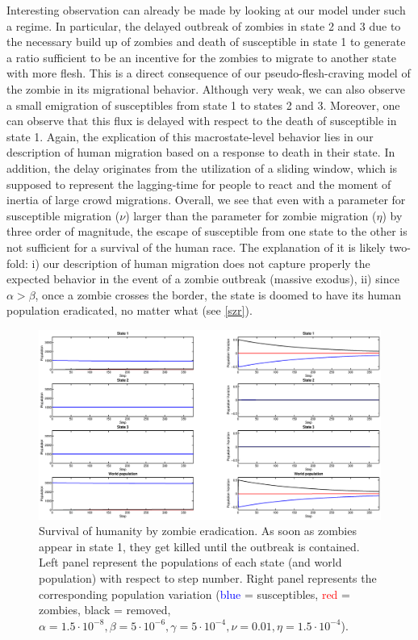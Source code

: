 \documentclass[11pt]{article} %
\begin{document}
Interesting observation can already be made by looking at our model under such a regime. In particular, the delayed outbreak of zombies in state 2 and 3 due to the necessary build up of zombies and death of susceptible in state 1 to generate a ratio sufficient to be an incentive for the zombies to migrate to another state with more flesh. This is a direct consequence of our pseudo-flesh-craving model of the zombie in its migrational behavior. Although very weak, we can also observe a small emigration of susceptibles from state 1 to states 2 and 3. Moreover, one can observe that this flux is delayed with respect to the death of susceptible in state 1. Again, the explication of this macrostate-level behavior lies in our description of human migration based on a response to death in their state. In addition, the delay originates from the utilization of a sliding window, which is supposed to represent the lagging-time for people to react and the moment of inertia of large crowd migrations. Overall, we see that even with a parameter for susceptible migration ($\nu$) larger than the parameter for zombie migration ($\eta$) by three order of magnitude, the escape of susceptible from one state to the other is not sufficient for a survival of the human race. The explanation of it is likely two-fold: i) our description of human migration does not capture properly the expected behavior in the event of a zombie outbreak (massive exodus), ii) since $\alpha>\beta$, once a zombie crosses the border, the state is doomed to have its human population eradicated, no matter what (see \ref{szr}). 
\begin{figure}[h!]
\centerline{
\includegraphics[scale=0.35]{../images/Matlab_figures/example_zkill.eps}}
\caption{Survival of humanity by zombie eradication. As soon as zombies appear in state 1, they get killed until the outbreak is contained. Left panel represent the populations of each state (and world population) with respect to step number. Right panel represents the corresponding population variation (\textcolor{blue}{blue} = susceptibles, \textcolor{red}{red} = zombies, black = removed, $\alpha=1.5\cdot10^{-8}, \beta=5\cdot10^{-6}, \gamma=5\cdot10^{-4}, \nu=0.01, \eta=1.5\cdot10^{-4}$).
\label{skill} }
\end{figure}
\end{document}
